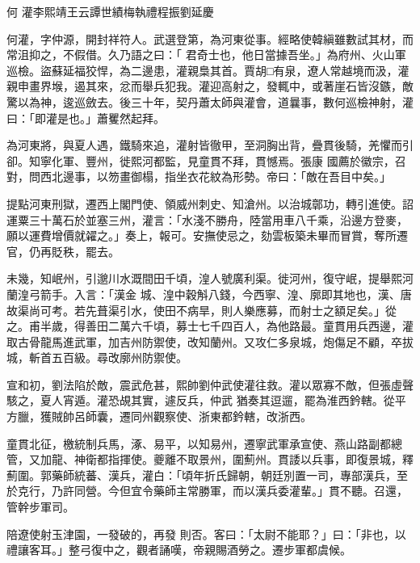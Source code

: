 
\begin{pinyinscope}

 何
 灌李熙靖王云譚世績梅執禮程振劉延慶



 何灌，字仲源，開封祥符人。武選登第，為河東從事。經略使韓縝雖數試其材，而常沮抑之，不假借。久乃語之曰：「
 君奇士也，他日當據吾坐。」為府州、火山軍巡檢。盜蘇延福狡悍，為二邊患，灌親梟其首。賈胡□有泉，遼人常越境而汲，灌親申畫界堠，遏其來，忿而舉兵犯我。灌迎高射之，發輒中，或著崖石皆沒鏃，敵驚以為神，逡巡斂去。後三十年，契丹蕭太師與灌會，道曩事，數何巡檢神射，灌曰：「即灌是也。」蕭矍然起拜。



 為河東將，與夏人遇，鐵騎來追，灌射皆徹甲，至洞胸出背，疊貫後騎，羌懼而引卻。知寧化軍、豐州，徙熙河都監，見童貫不拜，貫憾焉。張康
 國薦於徽宗，召對，問西北邊事，以笏畫御榻，指坐衣花紋為形勢。帝曰：「敵在吾目中矣。」



 提點河東刑獄，遷西上閣門使、領威州刺史、知滄州。以治城鄣功，轉引進使。詔運粟三十萬石於並塞三州，灌言：「水淺不勝舟，陸當用車八千乘，沿邊方登麥，願以運費增價就糴之。」奏上，報可。安撫使忌之，劾雲板築未畢而冒賞，奪所遷官，仍再貶秩，罷去。



 未幾，知岷州，引邈川水溉間田千頃，湟人號廣利渠。徙河州，復守岷，提舉熙河蘭湟弓箭手。入言：「漢金
 城、湟中穀斛八錢，今西寧、湟、廓即其地也，漢、唐故渠尚可考。若先葺渠引水，使田不病旱，則人樂應募，而射士之額足矣。」從之。甫半歲，得善田二萬六千頃，募士七千四百人，為他路最。童貫用兵西邊，灌取古骨龍馬進武軍，加吉州防禦使，改知蘭州。又攻仁多泉城，炮傷足不顧，卒拔城，斬首五百級。尋改廓州防禦使。



 宣和初，劉法陷於敵，震武危甚，熙帥劉仲武使灌往救。灌以眾寡不敵，但張虛聲駭之，夏人宵遁。灌恐覘其實，遽反兵，仲武
 猶奏其逗遛，罷為淮西鈐轄。從平方臘，獲賊帥呂師囊，遷同州觀察使、浙東都鈐轄，改浙西。



 童貫北征，檄統制兵馬，涿、易平，以知易州，遷寧武軍承宣使、燕山路副都總管，又加龍、神衛都指揮使。夔離不取景州，圍薊州。貫諉以兵事，即復景城，釋薊圍。郭藥師統蕃、漢兵，灌白：「頃年折氏歸朝，朝廷別置一司，專部漢兵，至於克行，乃許同營。今但宜令藥師主常勝軍，而以漢兵委灌輩。」貫不聽。召還，管幹步軍司。



 陪遼使射玉津園，一發破的，再發
 則否。客曰：「太尉不能耶？」曰：「非也，以禮讓客耳。」整弓復中之，觀者誦嘆，帝親賜酒勞之。遷步軍都虞候。




\end{pinyinscope}
